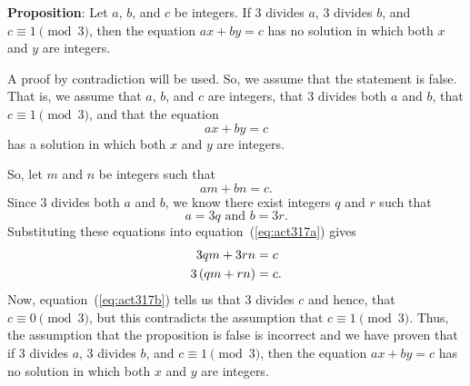 \documentclass[11pt]{article}
\begin{document}
\noindent
\textbf{Proposition}: Let  $a$, $b$, and $c$  be integers.  If  3  divides  $a$,  3  divides  $b$,  and  $c \equiv 1 \pmod 3$, then the equation $ax + by = c$ has no solution in which both  $x$  and  $y$  are integers.

\begin{myproof}
A proof by contradiction will be used.  So, we assume that the statement is false.  That is, we assume that $a$, $b$, and $c$ are integers, that  3  divides both  $a$  and  $b$, that  $c \equiv 1 \pmod 3$,  and that  the equation
\[
ax + by = c
\]
has a solution in which both  $x$  and  $y$  are integers.

So, let  $m$  and  $n$  be integers  such that 
\setcounter{equation}{0}
\begin{equation} \label{eq:act317a}
am  + bn  = c.
\end{equation}
Since  3  divides both  $a$  and  $b$, we know there exist integers  $q$  and  $r$  such that
\[
a = 3q\text{  and  }b = 3r.
\]
Substituting these equations into equation~(\ref{eq:act317a}) gives
\begin{align} 
  3qm + 3rn &= c \notag \\ 
  3\left( {qm + rn} \right) &= c.  \label{eq:act317b}
\end{align}
Now, equation~(\ref{eq:act317b}) tells us that  3  divides  $c$ and hence, that  
$c \equiv 0 \pmod 3$, but this contradicts the assumption that  $c \equiv 1 \pmod 3$.  Thus, the assumption that the proposition is false is incorrect and we have proven that if  3  divides  $a$,  3  divides  $b$,  and  $c \equiv 1 \pmod 3$, then the equation $ax + by = c$  has no solution in which both  $x$  and  $y$  are integers.
\end{myproof}
\end{document}
